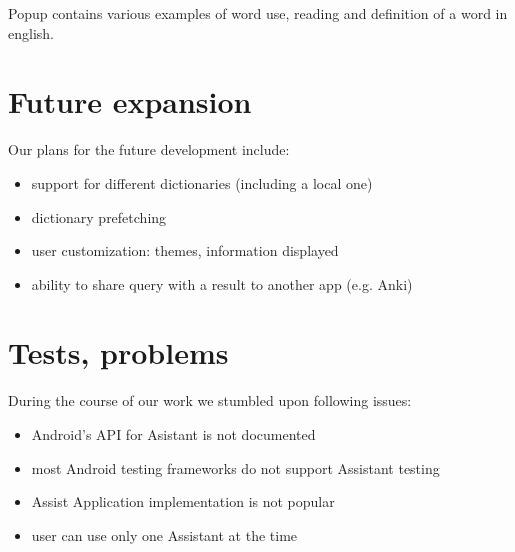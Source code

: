 \documentclass[11pt,a4paper]{article}
\begin{document}
Popup contains various examples of word use, reading and definition of a word
in english.

\newpage

\section{Future expansion}

Our plans for the future development include:
\begin{itemize}
    \item support for different dictionaries (including a local one)
    \item dictionary prefetching
    \item user customization: themes, information displayed
    \item ability to share query with a result to another app (e.g. Anki)
\end{itemize}

\section{Tests, problems}

During the course of our work we stumbled upon following issues:
\begin{itemize}
    \item Android's API for Asistant is not documented
    \item most Android testing frameworks do not support Assistant testing
    \item Assist Application implementation is not popular
    \item user can use only one Assistant at the time
\end{itemize}
\end{document}
